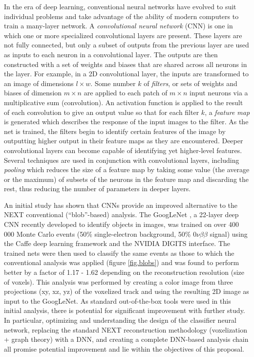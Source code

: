 \documentclass[11pt,a4paper]{article}
\begin{document}

In the era of deep learning, conventional neural networks have evolved to suit individual problems and take advantage of the ability of modern computers to train a many-layer network. A \emph{convolutional neural network} (CNN) is one in which one or more specialized convolutional layers are present. These layers are not fully connected, but only a subset of outputs from the previous layer are used as inputs to each neuron in a convolutional layer. The outputs are then constructed with a set of weights and biases that are shared across all neurons in the layer. For example, in a 2D convolutional layer, the inputs are transformed to an image of dimensions $l \times w$. Some number $k$ of \emph{filters}, or sets of weights and biases of dimension $m \times n$ are applied to each patch of $m \times n$ input neurons via a multiplicative sum (convolution). An activation function is applied to the result of each convolution to give an output value so that for each filter $k$, a \emph{feature map} is generated which describes the response of the input images to the filter. As the net is trained, the filters begin to identify certain features of the image by outputting higher output in their feature maps as they are encountered. Deeper convolutional layers can become capable of identifying yet higher-level features. Several techniques are used in conjunction with convolutional layers, including \emph{pooling} which reduces the size of a feature map by taking some value (the average or the maximum) of subsets of the neurons in the feature map and discarding the rest, thus reducing the number of parameters in deeper layers. 

An initial study \cite{NEXT_DNN} has shown that CNNs provide an improved alternative to the NEXT conventional (``blob''-based) analysis. The GoogLeNet \cite{Googlenet}, a 22-layer deep CNN recently developed to identify objects in images, was trained on over 400 000 Monte Carlo events (50\% single-electron background, 50\% $0\nu\beta\beta$ signal) using the Caffe deep learning framework \cite{jia2014caffe} and the NVIDIA DIGITS \cite{DIGITS} interface. The trained nets were then used to classify the same events as those to which the conventional analysis was applied (figure \ref{fig.blobs}) and was found to perform better by a factor of 1.17 - 1.62 depending on the reconstruction resolution (size of voxels). This analysis was performed by creating a color image from three projections (xy, xz, yz) of the voxelized track and using the resulting 2D image as input to the GoogLeNet. As standard out-of-the-box tools were used in this initial analysis, there is potential for significant improvement with further study. In particular, optimizing and understanding the design of the classifier neural network, replacing the standard NEXT reconstruction methodology (voxelization + graph theory) with a DNN, and creating a complete DNN-based analysis chain all promise potential improvement and lie within the objectives of this proposal.
\end{document}
